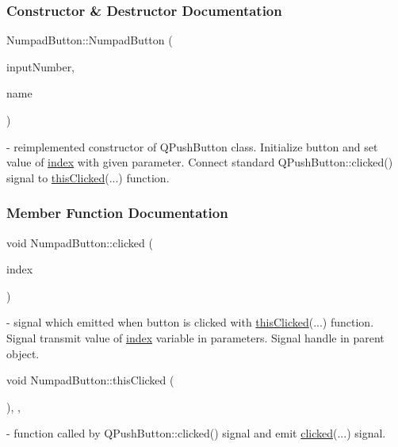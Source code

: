\subsubsection{Constructor \& Destructor Documentation}
\mbox{\label{classNumpadButton_af9f2a23d3636ab52dc1a9fd3b08d7275}} 
{\footnotesize\ttfamily Numpad\+Button\+::\texorpdfstring{Numpad\+Button}{NumpadButton} (\begin{DoxyParamCaption}\item[{unsigned int}]{input\+Number,  }\item[{Q\+String}]{name }\end{DoxyParamCaption})} - reimplemented constructor of Q\+Push\+Button class. Initialize button and set value of \hyperlink{classNumpadButton_a30f48faa378ce82a0cf63f6cdd781f0b}{index} with given parameter. Connect standard Q\+Push\+Button::clicked() signal to \hyperlink{classNumpadButton_ae8d4b24f9b83f0cb9cc9a97c0e1055e4}{this\+Clicked}(...) function.


\subsubsection{Member Function Documentation}
\mbox{\label{classNumpadButton_abb1a48f3c07d93edef33528e70e77ed7}} 
{\footnotesize\ttfamily void Numpad\+Button\+::\texorpdfstring{clicked}{clicked} (\begin{DoxyParamCaption}\item[{int}]{index }\end{DoxyParamCaption})\hspace{0.3cm}{\ttfamily [signal]}} - signal which emitted when button is  clicked with \hyperlink{classNumpadButton_ae8d4b24f9b83f0cb9cc9a97c0e1055e4}{this\+Clicked}(...) function. Signal transmit value of \hyperlink{classNumpadButton_a30f48faa378ce82a0cf63f6cdd781f0b}{index} variable in parameters. Signal handle in parent object.

\mbox{\label{classNumpadButton_ae8d4b24f9b83f0cb9cc9a97c0e1055e4}} 
{\footnotesize\ttfamily void Numpad\+Button\+::\texorpdfstring{this\+Clicked}{thisClicked} (\begin{DoxyParamCaption}{ }\end{DoxyParamCaption})\hspace{0.3cm}{\ttfamily [inline]}, {\ttfamily [private]}, {\ttfamily [slot]}} - function called by Q\+Push\+Button::clicked() signal and emit \hyperlink{classNumpadButton_abb1a48f3c07d93edef33528e70e77ed7}{clicked}(...) signal.

